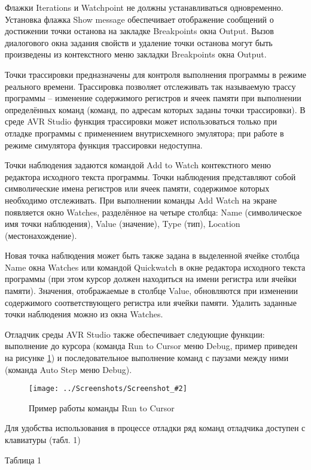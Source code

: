 \documentclass[14pt,a4paper]{extreport}
\newcommand{\sshot}[2]{\begin{figure}[ht]%
\centering\texttt{[image: ../Screenshots/Screenshot\_\#2]}%
\caption{#1}%
\label{sshot#2}%
\end{figure}%
}
\begin{document}
	Флажки Iterations и Watchpoint не должны устанавливаться одновременно. Установка флажка Show message обеспечивает отображение сообщений о достижении точки останова на закладке Breakpoints окна Output. Вызов диалогового окна задания свойств и удаление точки останова могут быть произведены из контекстного меню закладки Breakpoints окна Output.
	
	\clearpage
	
	Точки трассировки предназначены для контроля выполнения программы в режиме реального времени. Трассировка позволяет отслеживать так называемую трассу программы – изменение содержимого регистров и ячеек памяти при выполнении определённых команд (команд, по адресам которых заданы точки трассировки). В среде AVR Studio функция трассировки может использоваться только при отладке программы с применением внутрисхемного эмулятора; при работе в режиме симулятора функция трассировки недоступна.
	
	Точки наблюдения задаются командой Add to Watch контекстного меню редактора исходного текста программы. Точки наблюдения представляют собой символические имена регистров или ячеек памяти, содержимое которых необходимо отслеживать. При выполнении команды Add Watch на экране появляется окно Watches, разделённое на четыре столбца: Name (символическое имя точки наблюдения), Value (значение), Type (тип), Location (местонахождение). 
	
	Новая точка наблюдения может быть также задана в выделенной ячейке столбца Name окна Watches или командой Quickwatch в окне редактора исходного текста программы (при этом курсор должен находиться на имени регистра или ячейки памяти). Значения, отображаемые в столбце Value, обновляются при изменении содержимого соответствующего регистра или ячейки памяти. Удалить заданные точки наблюдения можно из окна Watches.
	
	Отладчик среды AVR Studio также обеспечивает следующие функции: выполнение до курсора (команда Run to Cursor меню Debug, пример приведен на рисунке \ref{sshot2}) и последовательное выполнение команд с паузами между ними (команда Auto Step меню Debug).
	
	\sshot{Пример работы команды Run to Cursor}{2}
	
	Для удобства использования в процессе отладки ряд команд отладчика доступен с клавиатуры (табл. 1)
	
\vspace{10pt}
	
\begin{flushleft}
Таблица 1
\end{flushleft}
\end{document}
